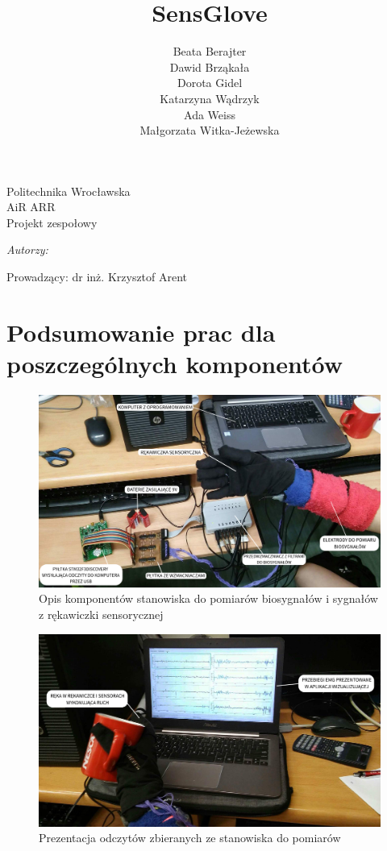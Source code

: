 \documentclass{article}
\author{Beata Berajter\\
Dawid Brząkała\\
Dorota Gidel\\
Katarzyna Wądrzyk\\
Ada Weiss\\
Małgorzata Witka-Jeżewska\\
 }
\title{SensGlove}
\makeatletter
\renewcommand{\maketitle}{\begin{titlepage}
    \vspace*{1cm}
    \begin{center}
    Politechnika Wrocławska\\
    AiR ARR\\
 Projekt zespołowy
    \end{center}
      \vspace{3cm}
    \begin{center}

     \LARGE \textsc {\@title}
         \end{center}
     \vspace{1cm}

    \begin{center}
    \textit{ Autorzy:}\\
   \textit{\@author}
     \end{center}
      \vspace{1cm}

     \begin{center}

    Prowadzący:
  dr inż. Krzysztof Arent
    \end{center}

    \vspace*{\stretch{6}}
    \begin{center}
    \@date
    \end{center}
  \end{titlepage}
}
\makeatother
\begin{document}
\maketitle
\newpage
\tableofcontents
\newpage




%
%
%
%
%
\section{Podsumowanie prac dla poszczególnych komponentów}

\begin{figure}[H]
	\centering
	\includegraphics[width=16cm]{rekawiczka_opis_stanowiska.png}
	\caption{Opis komponentów stanowiska do pomiarów biosygnałów i sygnałów z rękawiczki sensorycznej}
	\label{rys:stanowisko}
\end{figure}

\begin{figure}[H]
	\centering
	\includegraphics[width=16cm]{rekawiczka_aplikacja.png}
	\caption{Prezentacja odczytów zbieranych ze stanowiska do pomiarów}
	\label{rys:stanowisko}
\end{figure}
\end{document}
